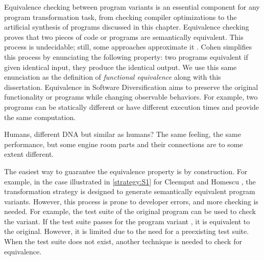 
Equivalence checking between program variants is an essential component for any program transformation task, from checking compiler optimizations \cite{LeCompilers} to the artificial synthesis of programs discussed in this chapter. 
Equivalence checking proves that two pieces of code or programs are semantically equivalent.
This process is undecidable; still, some approaches approximate it \cite{churchill2019}. %
Cohen \cite{cohen1993operating} simplifies this process by enunciating the following property: two programs equivalent if given identical input, they produce the identical output. We use this same enunciation as the definition of \emph{functional equivalence} along with this dissertation. 
Equivalence in Software Diversification aims to preserve the original functionality or programs while changing observable behaviors. For example, two programs can be statically different or have different execution times and provide the same computation. 



Humans, different DNA but similar as humans?
The same feeling, the same performance, but some engine room parts and their connections are to some extent different.





The easiest way to guarantee the equivalence property is by construction. For example, in the case illustrated in \autoref{strategy:S1} for Cleemput \etal \cite{Cleemput2012} and Homescu \etal \cite{homescu2013profile}, the transformation strategy is designed to generate semantically equivalent program variants. However, this process is prone to developer errors, and more checking is needed. For example, the test suite of the original program can be used to check the variant. If the test suite passes for the program variant \cite{harrand2020java}, it is equivalent to the original. However, it is limited due to the need for a preexisting test suite. When the test suite does not exist, another technique is needed to check for equivalence.

